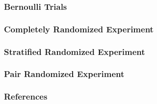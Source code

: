 \documentclass[xcolor=svgnames,t]{beamer}
\begin{document}
\begin{frame}
    \frametitle{Bernoulli Trials}
\end{frame}
\begin{frame}
    \frametitle{Completely Randomized Experiment}
\end{frame}    

\begin{frame}
    \frametitle{Stratified Randomized Experiment}
\end{frame}   

\begin{frame}
    \frametitle{Pair Randomized Experiment}
\end{frame} 
    
\begin{frame} [allowframebreaks]
    \frametitle{References}
    
    
\end{frame}
\end{document}
